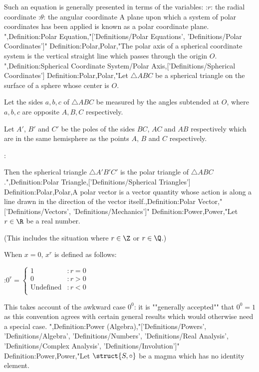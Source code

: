 Such an equation is generally presented in terms of the variables:
:$r$: the radial coordinate
:$\theta$: the angular coordinate
A plane upon which a system of polar coordinates has been applied is known as a polar coordinate plane.
",Definition:Polar Equation,"['Definitions/Polar Equations', 'Definitions/Polar Coordinates']"
Definition:Polar,Polar,"The polar axis of a spherical coordinate system is the vertical straight line which passes through the origin $O$.
",Definition:Spherical Coordinate System/Polar Axis,['Definitions/Spherical Coordinates']
Definition:Polar,Polar,"Let $\triangle ABC$ be a spherical triangle on the surface of a sphere whose center is $O$.

Let the sides $a, b, c$ of $\triangle ABC$ be measured by the angles subtended at $O$, where $a, b, c$ are opposite $A, B, C$ respectively.


Let $A'$, $B'$ and $C'$ be the poles of the sides $BC$, $AC$ and $AB$ respectively which are in the same hemisphere as the points $A$, $B$ and $C$ respectively.

:

Then the spherical triangle $\triangle A'B'C'$ is the polar triangle of $\triangle ABC$.",Definition:Polar Triangle,['Definitions/Spherical Triangles']
Definition:Polar,Polar,A polar vector is a vector quantity whose action is along a line drawn in the direction of the vector itself.,Definition:Polar Vector,"['Definitions/Vectors', 'Definitions/Mechanics']"
Definition:Power,Power,"Let $r \in \R$ be a real number.

(This includes the situation where $r \in \Z$ or $r \in \Q$.)

When $x=0$, $x^r$ is defined as follows:

:$0^r = \begin{cases}
1 & : r = 0 \\
0 & : r > 0 \\
\text{Undefined} & : r < 0 \\
\end{cases}$

This takes account of the awkward case $0^0$: it is ""generally accepted"" that $0^0 = 1$ as this convention agrees with certain general results which would otherwise need a special case.
",Definition:Power (Algebra),"['Definitions/Powers', 'Definitions/Algebra', 'Definitions/Numbers', 'Definitions/Real Analysis', 'Definitions/Complex Analysis', 'Definitions/Involution']"
Definition:Power,Power,"Let $\struct {S, \circ}$ be a magma which has no identity element.

